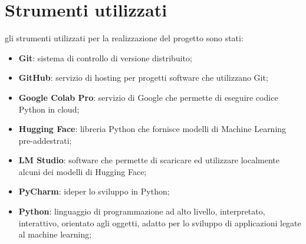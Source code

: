 \section{Strumenti utilizzati}
gli strumenti utilizzati per la realizzazione del progetto sono stati:
\begin{itemize}
    \item \textbf{Git}: sistema di controllo di versione distribuito;
    \item \textbf{GitHub}: servizio di hosting per progetti software che utilizzano Git;
    \item \textbf{Google Colab Pro}: servizio di Google che permette di eseguire codice Python in cloud;
    \item \textbf{Hugging Face}: libreria Python che fornisce modelli di Machine Learning pre-addestrati;
    \item \textbf{LM Studio}: software che permette di scaricare ed utilizzare localmente alcuni dei modelli di Hugging Face;
    \item \textbf{PyCharm}: \gls{ide}\glox per lo sviluppo in Python;
    \item \textbf{Python}: linguaggio di programmazione ad alto livello, interpretato, interattivo, orientato agli oggetti, adatto per lo sviluppo di applicazioni legate al machine learning;
\end{itemize}

\newpage